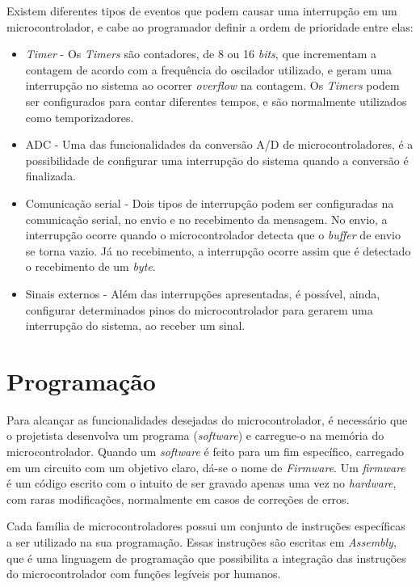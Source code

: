 Existem diferentes tipos de eventos que podem causar uma interrupção em um microcontrolador, e cabe ao programador definir a ordem de prioridade entre elas:
\begin{itemize}
\item \textit{Timer} - Os \textit{Timers} são contadores, de 8 ou 16 \textit{bits}, que incrementam a contagem de acordo com a frequência do oscilador utilizado, e geram uma interrupção no sistema ao ocorrer \textit{overflow} na contagem. Os \textit{Timers} podem ser configurados para contar diferentes tempos, e são normalmente utilizados como temporizadores.
\item \ac{ADC} - Uma das funcionalidades da conversão A/D de microcontroladores, é a possibilidade de configurar uma interrupção do sistema quando a conversão é finalizada.
\item Comunicação serial - Dois tipos de interrupção podem ser configuradas na comunicação serial, no envio e no recebimento da mensagem. No envio, a interrupção ocorre quando o microcontrolador detecta que o \textit{buffer} de envio se torna vazio. Já no recebimento, a interrupção ocorre assim que é detectado o recebimento de um \textit{byte}.
\item Sinais externos - Além das interrupções apresentadas, é possível, ainda, configurar determinados pinos do microcontrolador para gerarem uma interrupção do sistema, ao receber um sinal.
\end{itemize}

\section{Programação}

Para alcançar as funcionalidades desejadas do microcontrolador, é necessário que o projetista desenvolva um programa (\textit{software}) e carregue-o na memória do microcontrolador. Quando um \textit{software} é feito para um fim específico, carregado em um circuito com um objetivo claro, dá-se o nome de \textit{Firmware}. Um \textit{firmware} é um código escrito com o intuito de ser gravado apenas uma vez no \textit{hardware}, com raras modificações, normalmente em casos de correções de erros.

Cada família de microcontroladores possui um conjunto de instruções específicas a ser utilizado na sua programação. Essas instruções são escritas em \textit{Assembly}, que é uma linguagem de programação que possibilita a integração das instruções do microcontrolador com funções legíveis por humanos.

